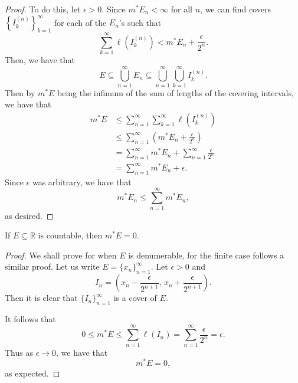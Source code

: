 \documentclass[notoc,notitlepage]{tufte-book}
\begin{document}
\begin{proof}
  To do this, let $\epsilon > 0$. Since $m^* E_n < \infty$ for all $n$, we can
  find covers $\left\{ I_k^{(n)} \right\}_{k=1}^{\infty}$ for each of the
  $E_n$'s such that
  \begin{equation*}
    \sum_{k=1}^{\infty} \ell\left(I_k^{(n)}\right) < m^* E_n +
    \frac{\epsilon}{2^n}.
  \end{equation*}
  Then, we have that
  \begin{equation*}
    E \subseteq \bigcup_{n=1}^{\infty} E_n \subseteq \bigcup_{n=1}^{\infty}
    \bigcup_{k=1}^{\infty}  I_k^{(n)}.
  \end{equation*}
  Then by $m^* E$ being the infimum of the sum of lengths of the covering
  intervals, we have that
  \begin{align*}
    m^* E &\leq \sum_{n=1}^{\infty} \sum_{k=1}^{\infty} \ell \left( I_k^{(n)}
            \right) \\
          &\leq \sum_{n=1}^{\infty} \left( m^* E_n + \frac{\epsilon}{2^n}
            \right) \\
          &= \sum_{n=1}^{\infty} m^* E_n + \sum_{n=1}^{\infty}
            \frac{\epsilon}{2^n} \\
          &= \sum_{n=1}^{\infty} m^* E_n + \epsilon.
  \end{align*}
  Since $\epsilon$ was arbitrary, we have that
  \begin{equation*}
    m^* E_n \leq \sum_{n=1}^{\infty} m^* E_n,
  \end{equation*}
  as desired.
\end{proof}

\begin{crly}\label{crly:lebesgue_outer_measure_of_countable_sets_is_zero}
  If $E \subseteq \mathbb{R}$ is countable, then $m^* E = 0$.
\end{crly}

\begin{proof}
  We shall prove for when $E$ is denumerable, for the finite case follows a
  similar proof. Let us write $E = \{ x_n \}_{n=1}^{\infty}$. Let $\epsilon > 0$ 
  and
  \begin{equation*}
    I_n = \left( x_n - \frac{\epsilon}{2^{n+1}},\, x_n + \frac{\epsilon}{2^{n+1}}
    \right).
  \end{equation*}
  Then it is clear that $\{ I_n \}_{n=1}^{\infty}$ is a cover of $E$.
  
  It follows that
  \begin{equation*}
    0 \leq m^* E \leq \sum_{n=1}^{\infty} \ell (I_n) = \sum_{n=1}^{\infty}
    \frac{\epsilon}{2^n} = \epsilon.
  \end{equation*}
  Thus as $\epsilon \to 0$, we have that
  \begin{equation*}
    m^* E = 0,
  \end{equation*}
  as expected.
\end{proof}
\end{document}
